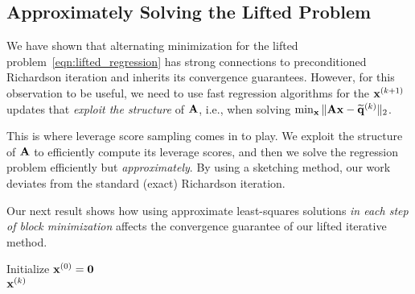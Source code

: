 \subsection{Approximately Solving the Lifted Problem}
\label{sec:approx-solve-lifted}

We have shown that alternating minimization for the lifted problem~\eqref{eqn:lifted_regression}
has strong connections to preconditioned Richardson iteration
and inherits its convergence guarantees.
However, for this observation to be useful,
we need to use fast regression algorithms for the $\mathbf{x}^{(k+1)}$ updates that \emph{exploit the structure} of $\mathbf{A}$,
i.e.,
when solving $\min_{\mathbf{x}}\, \lVert\mathbf{Ax} - \widetilde{\mathbf{q}}^{(k)}\rVert_2$.

This is where leverage score sampling comes in to play.
We exploit the structure of $\mathbf{A}$ to efficiently compute its leverage scores,
and then we solve the regression problem efficiently but \emph{approximately}.
By using a sketching method, our work deviates from the standard (exact) Richardson iteration.

Our next result shows how using approximate least-squares solutions
\emph{in each step of block minimization}
affects the convergence guarantee of our lifted iterative method.

\begin{algorithm2e}[t]
    \caption{\LiftedApproximateSolver}
    \label{alg:approximate-lifting}
	\BlankLine
	\KwData{$\mat{A},\widetilde{\mat{P}} \in \R^{I \times R}$, $\widetilde{\mat{q}}\in\R^{I}$, $\beta \geq 1$, $\epsilon \in (0,1)$, $\widehat{\epsilon} \in [0, 1/\beta^2)$ with $\widetilde{\mat{P}}^\top \widetilde{\mat{P}} \preceq \mat{A}^\top \mat{A} \preceq \beta \cdot \widetilde{\mat{P}}^\top \widetilde{\mat{P}}$}
	\BlankLine
	Initialize $\mathbf{x}^{(0)}=\boldsymbol{0}$ \\
        
    \Return $\mathbf{x}^{(k)}$
\end{algorithm2e}

